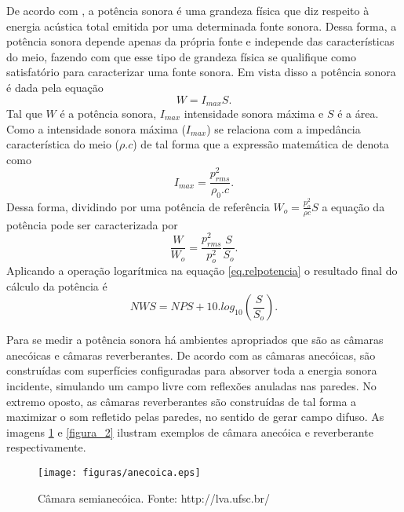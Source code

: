 De acordo com \cite{potencia}, a potência sonora é uma grandeza física que diz respeito à energia acústica total emitida por uma determinada fonte sonora. Dessa forma, a potência sonora depende apenas da própria fonte e independe das características do meio, fazendo com que esse tipo de grandeza física se qualifique como satisfatório para caracterizar uma fonte sonora. Em vista disso a potência sonora é dada pela equação
\begin{equation}
W = I_{max}S.
\label{eq.potencia}
\end{equation}
Tal que $W$ é a potência sonora, $I_{max}$ intensidade sonora máxima e $S$ é a área. Como a intensidade sonora máxima ($I_{max}$) se relaciona com a impedância característica do meio ($\rho . c$) de tal forma que a expressão matemática de denota como \begin{equation}
I_{max}=\frac{p_{rms}^{2}}{\rho_{0} . c}.
\label{eq.intensidade}
\end{equation}
Dessa forma, dividindo por uma potência de referência $W_{o}= \frac{p_{o}^{2}}{\rho c}S $ a equação da potência pode ser caracterizada por
 \begin{equation}
	\frac{W}{W_{o}}=\frac{p_{rms}^{2}}{p_{o}^{2}}\frac{S}{S_{o}}.
\label{eq.relpotencia}
\end{equation}
Aplicando a operação logarítmica na equação \ref{eq.relpotencia} o resultado final do cálculo da potência é
\begin{equation}
	NWS = NPS + 10 . log_{10}\left(\frac{S}{S_{o}}\right).
\end{equation}

Para se medir a potência sonora há ambientes apropriados que são as câmaras anecóicas e câmaras reverberantes. De acordo com \cite{bistafa} as câmaras anecóicas, são construídas com superfícies configuradas para absorver toda a energia sonora incidente, simulando um campo livre com reflexões anuladas nas paredes. No extremo oposto, as câmaras reverberantes são construídas de tal forma a maximizar o som refletido pelas paredes, no sentido de gerar campo difuso. As imagens \ref{figura_1} e \ref{figura_2} ilustram exemplos de câmara anecóica e reverberante respectivamente.

\begin{figure}[h!]
    \centering
    \texttt{[image: figuras/anecoica.eps]}
    \caption{Câmara semianecóica. Fonte: http://lva.ufsc.br/}
    \label{figura_1}
\end{figure}


